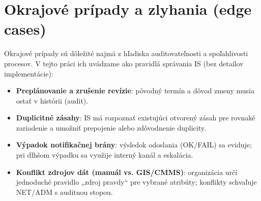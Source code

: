 \begin{table}[!htbp]
\centering
\small
\setlength{\tabcolsep}{3pt}
\renewcommand{\arraystretch}{1.2}
\caption{Zhrnutie pravidiel notifikácií a eskalácií.}
\label{tab:notification-rules}
\end{table}

\section{Okrajové prípady a zlyhania (edge cases)}
\label{sec:edge-cases}

Okrajové prípady sú dôležité najmä z hľadiska auditovateľnosti a spoľahlivosti procesov.
V tejto práci ich uvádzame ako pravidlá správania IS (bez detailov implementácie):

\begin{itemize}
\item \textbf{Preplánovanie a zrušenie revízie}: pôvodný termín a dôvod zmeny musia ostať v histórii (audit).
\item \textbf{Duplicitné zásahy}: IS má rozpoznať existujúci otvorený zásah pre rovnaké zariadenie a umožniť prepojenie alebo zdôvodnenie duplicity.
\item \textbf{Výpadok notifikačnej brány}: výsledok odoslania (OK/FAIL) sa eviduje; pri dlhšom výpadku sa využije interný kanál a eskalácia.
\item \textbf{Konflikt zdrojov dát (manuál vs. GIS/CMMS)}: organizácia určí jednoduché pravidlo „zdroj pravdy“ pre vybrané atribúty; konflikty schvaľuje NET/ADM s auditnou stopou.
\end{itemize}

